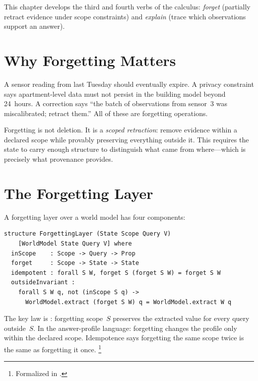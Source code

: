 \documentclass[11pt,openany]{report}
\begin{document}
This chapter develops the third and fourth verbs of the calculus:
\emph{forget} (partially retract evidence under scope constraints) and
\emph{explain} (trace which observations support an answer).

\section{Why Forgetting Matters}

A sensor reading from last Tuesday should eventually expire.  A privacy
constraint says apartment-level data must not persist in the building
model beyond 24~hours.  A correction says ``the batch of observations
from sensor~3 was miscalibrated; retract them.''  All of these are
forgetting operations.

Forgetting is not deletion.  It is a \emph{scoped retraction}: remove
evidence within a declared scope while provably preserving everything
outside it.  This requires the state to carry enough structure to
distinguish what came from where---which is precisely what provenance
provides.

\section{The Forgetting Layer}
\label{sec:forgetting}

A forgetting layer over a world model has four components:

\begin{lstlisting}[language={}]
structure ForgettingLayer (State Scope Query V)
    [WorldModel State Query V] where
  inScope    : Scope -> Query -> Prop
  forget     : Scope -> State -> State
  idempotent : forall S W, forget S (forget S W) = forget S W
  outsideInvariant :
    forall S W q, not (inScope S q) ->
      WorldModel.extract (forget S W) q = WorldModel.extract W q
\end{lstlisting}

\noindent
The key law is : forgetting scope~$S$ preserves
the extracted value for every query outside~$S$.  In the answer-profile
language: forgetting changes the profile only within the declared scope.
Idempotence says forgetting the same scope twice is the same as
forgetting it once.%
\footnote{Formalized in
.}

\end{document}
